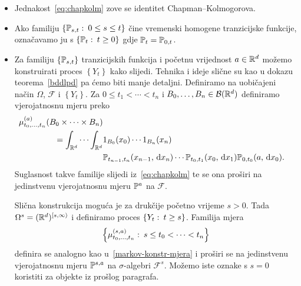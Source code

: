 \documentclass[main.tex]{subfiles}
\begin{document}
\begin{komentar} \label{markov-konstr}
	\begin{itemize}
		\item Jednakost~\eqref{eq:chapkolm} zove se identitet Chapman--Kolmogorova.
		\item Ako familiju \( \{\Ptrans_{s, t} \st 0 \le s \le t \} \) čine vremenski homogene tranzicijske funkcije, označavamo ju s \( \left\{ \Ptrans_t \st t \ge 0 \right\} \) gdje \( \Ptrans_t = \Ptrans_{0, t} \).
		\item Za familiju \( \left\{ \Ptrans_{s, t} \right\} \) tranzicijskih funkcija i početnu vrijednost \( a \in \R^d \) možemo konstruirati proces \( \left\{ Y_t \right\} \) kako slijedi. Tehnika i ideje slične su
		      kao u dokazu teorema~\ref{bddlpd} pa ćemo biti manje detaljni. Definiramo na uobičajeni način \( \Omega \), \( \mathcal F \) i \( \left\{ Y_t \right\} \). Za \( 0 \le t_1 < \cdots < t_n \) i \( B_0, \ldots, B_n \in \mathcal B(\R^d) \) definiramo vjerojatnosnu mjeru preko
		      \begin{equation} \label{markov-konstr-mjera}
			      \begin{aligned}
				      \mu_{t_0, \ldots, t_n}^{(a)}(B_0  \times \cdots \times B_n)                       \\
				      = \int_{\R^d} \cdots \int_{\R^d} & 1_{B_0}(x_0)\cdots 1_{B_n}(x_n)                \\
				                                       & \Ptrans_{t_{n-1}, t_n}(x_{n-1}, \D x_n) \cdots
				      \Ptrans_{t_0, t_1}(x_0, \D x_1) \Ptrans_{0, t_0}(a, \D x_0).
			      \end{aligned}
		      \end{equation}
		      Suglasnost takve familije slijedi iz~\eqref{eq:chapkolm} te se ona proširi na jedinstvenu vjerojatnosnu mjeru \( \Ptrans^{a} \) na \( \mathcal F \).

		      Slična konstrukcija moguća je za drukčije početno vrijeme \( s > 0 \). Tada \( \Omega^s = (\R^d)^{\left[ s, \infty \right\rangle} \) i definiramo proces \( \left\{ Y_t \st t \ge s \right\} \).
		      Familija mjera \[ \left\{ \mu^{(s,a)}_{t_0,\ldots,t_n} \st s \le t_0 < \cdots < t_n \right\} \]
		      definira se analogno kao u~\eqref{markov-konstr-mjera} i proširi se na jedinstvenu vjerojatnosnu mjeru \( \P^{s,a} \) na \( \sigma \)-algebri \( \mathcal F^s \).
		      Možemo iste oznake s \( s=0 \) koristiti za objekte iz prošlog paragrafa.
	\end{itemize}
\end{komentar}
\end{document}
